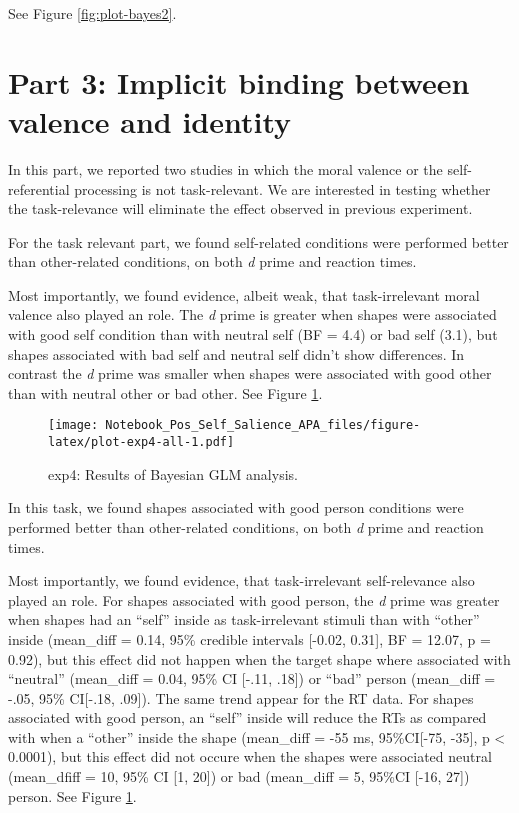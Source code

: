 \documentclass[
  english,
  man]{apa6}
\begin{document}
See Figure \ref{fig:plot-bayes2}.

\hypertarget{part-3-implicit-binding-between-valence-and-identity}{%
\section{Part 3: Implicit binding between valence and identity}\label{part-3-implicit-binding-between-valence-and-identity}}

In this part, we reported two studies in which the moral valence or the self-referential processing is not task-relevant. We are interested in testing whether the task-relevance will eliminate the effect observed in previous experiment.

For the task relevant part, we found self-related conditions were performed better than other-related conditions, on both \emph{d} prime and reaction times.

Most importantly, we found evidence, albeit weak, that task-irrelevant moral valence also played an role. The \emph{d} prime is greater when shapes were associated with good self condition than with neutral self (BF = 4.4) or bad self (3.1), but shapes associated with bad self and neutral self didn't show differences. In contrast the \emph{d} prime was smaller when shapes were associated with good other than with neutral other or bad other. See Figure \ref{fig:plot-exp4-all}.

\begin{figure}
\centering
\texttt{[image: Notebook\_Pos\_Self\_Salience\_APA\_files/figure-latex/plot-exp4-all-1.pdf]}
\caption{\label{fig:plot-exp4-all}exp4: Results of Bayesian GLM analysis.}
\end{figure}

In this task, we found shapes associated with good person conditions were performed better than other-related conditions, on both \emph{d} prime and reaction times.

Most importantly, we found evidence, that task-irrelevant self-relevance also played an role. For shapes associated with good person, the \emph{d} prime was greater when shapes had an ``self'' inside as task-irrelevant stimuli than with ``other'' inside (mean\_diff = 0.14, 95\% credible intervals {[}-0.02, 0.31{]}, BF = 12.07, p = 0.92), but this effect did not happen when the target shape where associated with ``neutral'' (mean\_diff = 0.04, 95\% CI {[}-.11, .18{]}) or ``bad'' person (mean\_diff = -.05, 95\% CI{[}-.18, .09{]}). The same trend appear for the RT data. For shapes associated with good person, an ``self'' inside will reduce the RTs as compared with when a ``other'' inside the shape (mean\_diff = -55 ms, 95\%CI{[}-75, -35{]}, p \textless{} 0.0001), but this effect did not occure when the shapes were associated neutral (mean\_dfiff = 10, 95\% CI {[}1, 20{]}) or bad (mean\_diff = 5, 95\%CI {[}-16, 27{]}) person. See Figure \ref{fig:plot-exp4-all}.
\end{document}
